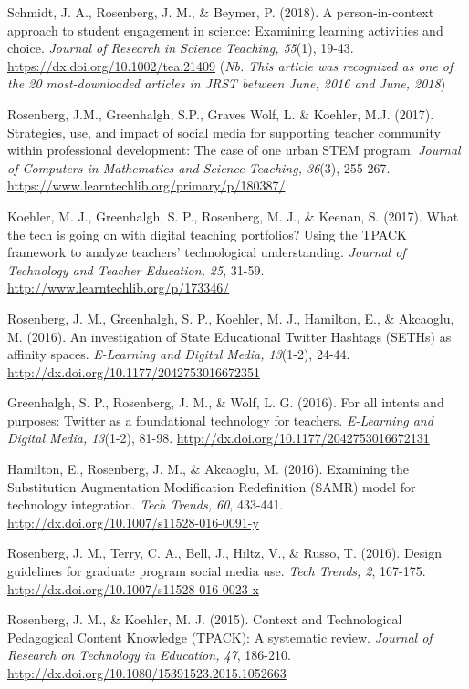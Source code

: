 \documentclass[14,]{article}
\begin{document}
Schmidt, J. A., Rosenberg, J. M., \& Beymer, P. (2018). A
person-in-context approach to student engagement in science: Examining
learning activities and choice. \emph{Journal of Research in Science
Teaching, 55}(1), 19-43. \url{https://dx.doi.org/10.1002/tea.21409}
(\emph{Nb. This article was recognized as one of the 20 most-downloaded
articles in JRST between June, 2016 and June, 2018})

Rosenberg, J.M., Greenhalgh, S.P., Graves Wolf, L. \& Koehler, M.J.
(2017). Strategies, use, and impact of social media for supporting
teacher community within professional development: The case of one urban
STEM program. \emph{Journal of Computers in Mathematics and Science
Teaching, 36}(3), 255-267.
\url{https://www.learntechlib.org/primary/p/180387/}

Koehler, M. J., Greenhalgh, S. P., Rosenberg, M. J., \& Keenan, S.
(2017). What the tech is going on with digital teaching portfolios?
Using the TPACK framework to analyze teachers' technological
understanding. \emph{Journal of Technology and Teacher Education, 25},
31-59. \url{http://www.learntechlib.org/p/173346/}

Rosenberg, J. M., Greenhalgh, S. P., Koehler, M. J., Hamilton, E., \&
Akcaoglu, M. (2016). An investigation of State Educational Twitter
Hashtags (SETHs) as affinity spaces. \emph{E-Learning and Digital Media,
13}(1-2), 24-44. \url{http://dx.doi.org/10.1177/2042753016672351}

Greenhalgh, S. P., Rosenberg, J. M., \& Wolf, L. G. (2016). For all
intents and purposes: Twitter as a foundational technology for teachers.
\emph{E-Learning and Digital Media, 13}(1-2), 81-98.
\url{http://dx.doi.org/10.1177/2042753016672131}

Hamilton, E., Rosenberg, J. M., \& Akcaoglu, M. (2016). Examining the
Substitution Augmentation Modification Redefinition (SAMR) model for
technology integration. \emph{Tech Trends, 60}, 433-441.
\url{http://dx.doi.org/10.1007/s11528-016-0091-y}

Rosenberg, J. M., Terry, C. A., Bell, J., Hiltz, V., \& Russo, T.
(2016). Design guidelines for graduate program social media use.
\emph{Tech Trends, 2}, 167-175.
\url{http://dx.doi.org/10.1007/s11528-016-0023-x}

Rosenberg, J. M., \& Koehler, M. J. (2015). Context and Technological
Pedagogical Content Knowledge (TPACK): A systematic review.
\emph{Journal of Research on Technology in Education, 47}, 186-210.
\url{http://dx.doi.org/10.1080/15391523.2015.1052663}
\end{document}
